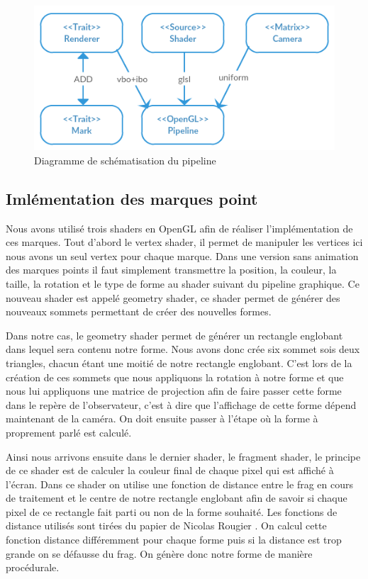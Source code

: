 \documentclass[12pt]{article}
\begin{document}
\begin{figure}[htp]
  \centering
  \includegraphics[scale=0.8]{images/pipeline}
  \caption{Diagramme de schématisation du pipeline}
  \label{fig:pipe}
\end{figure}


\subsection{Imlémentation des marques point}

Nous avons utilisé trois shaders en OpenGL afin de réaliser l'implémentation de ces marques. Tout d'abord le vertex shader, il permet de manipuler les vertices ici nous avons un seul vertex pour chaque marque. Dans une version sans animation des marques points il faut simplement transmettre la position, la couleur, la taille, la rotation et le type de forme au shader suivant du pipeline graphique. Ce nouveau shader est appelé geometry shader, ce shader permet de générer des nouveaux sommets permettant de créer des nouvelles formes.

Dans notre cas, le geometry shader permet de générer un rectangle englobant dans lequel sera contenu notre forme. Nous avons donc crée six sommet sois deux triangles, chacun étant une moitié de notre rectangle englobant. C'est lors de la création de ces sommets que nous appliquons la rotation à notre forme et que nous lui appliquons une matrice de projection afin de faire passer cette forme dans le repère de l'observateur, c'est à dire que l'affichage de cette forme dépend maintenant de la caméra. On doit ensuite passer à l'étape où la forme à proprement parlé est calculé.

Ainsi nous arrivons ensuite dans le dernier shader, le fragment shader, le principe de ce shader est de calculer la couleur final de chaque pixel qui est affiché à l'écran. Dans ce shader on utilise une fonction de distance entre le \gls{frag} en cours de traitement et le centre de notre rectangle englobant afin de savoir si chaque pixel de ce rectangle fait parti ou non de la forme souhaité. Les fonctions de distance utilisés sont tirées du papier de Nicolas Rougier \cite{Rougier}. On calcul cette fonction distance différemment pour chaque forme puis si la distance est trop grande on se défausse du \gls{frag}. On génère donc notre forme de manière procédurale.
\end{document}
